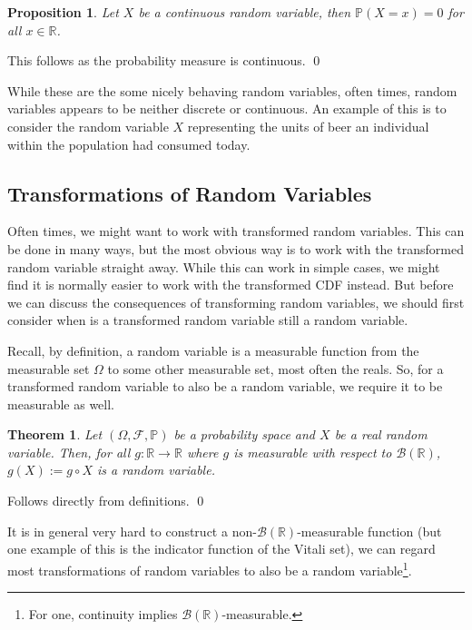 \documentclass[
]{article}
\newtheorem{theorem}{Theorem}
\newtheorem{prop}{Proposition}[theorem]
\theoremstyle{definition}
\begin{document}
\begin{prop}
  Let \(X\) be a continuous random variable, then \(\mathbb{P}(X = x) = 0\) for 
  all \(x \in \mathbb{R}\).
\end{prop}
\proof

This follows as the probability measure is continuous. \qed

While these are the some nicely behaving random variables, often times,
random variables appears to be neither discrete or continuous. An
example of this is to consider the random variable \(X\) representing
the units of beer an individual within the population had consumed
today.

\hypertarget{transformations-of-random-variables}{%
\subsection{Transformations of Random
Variables}\label{transformations-of-random-variables}}

Often times, we might want to work with transformed random variables.
This can be done in many ways, but the most obvious way is to work with
the transformed random variable straight away. While this can work in
simple cases, we might find it is normally easier to work with the
transformed CDF instead. But before we can discuss the consequences of
transforming random variables, we should first consider when is a
transformed random variable still a random variable.

Recall, by definition, a random variable is a measurable function from
the measurable set \(\Omega\) to some other measurable set, most often
the reals. So, for a transformed random variable to also be a random
variable, we require it to be measurable as well.

\begin{theorem}
  Let \((\Omega, \mathcal{F}, \mathbb{P})\) be a probability space and \(X\) 
  be a real random variable. Then, for all \(g : \mathbb{R} \to \mathbb{R}\) 
  where \(g\) is measurable with respect to \(\mathcal{B}(\mathbb{R})\), 
  \(g(X) := g \circ X\) is a random variable.
\end{theorem}
\proof

Follows directly from definitions. \qed

It is in general very hard to construct a
non-\(\mathcal{B}(\mathbb{R})\)-measurable function (but one example of
this is the indicator function of the Vitali set), we can regard most
transformations of random variables to also be a random
variable\footnote{For one, continuity implies \(\mathcal{B}(\mathbb{R})\)-measurable.}.
\end{document}
